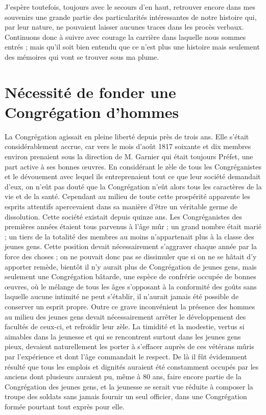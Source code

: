 J'espère toutefois, toujours avec le secours d'en haut, retrouver encore dans mes souvenirs une grande partie des particularités intéressantes de notre histoire qui, par leur nature, ne pouvaient laisser aucunes traces dans les procès verbaux. Continuons donc à suivre avec courage la carrière dans laquelle nous sommes entrés ; mais qu'il soit bien entendu que ce n'est plus une histoire mais seulement des mémoires qui vont se trouver sous ma plume.

\section*{Nécessité de fonder une Congrégation d'hommes}
La Congrégation agissait en pleine liberté depuis près de trois ans. Elle s'était considérablement accrue, car vers le mois d'août 1817 soixante et dix membres environ prenaient sous la direction de M. Garnier qui était toujours Préfet, une part active à ses bonnes œuvres. En considérant le zèle de tous les Congréganistes et le dévouement avec lequel ils entreprenaient tout ce que leur société demandait d'eux, on n'eût pas douté que la Congrégation n'eût alors tous les caractères de la vie et de la santé. Cependant au milieu de toute cette prospérité apparente les esprits attentifs apercevaient dans sa manière d'être un véritable germe de dissolution. Cette société existait depuis quinze ans. Les Congréganistes des premières années étaient tous parvenus à l'âge mûr ; un grand nombre était marié ; un tiers de la totalité des membres au moins n'appartenait plus à la classe des jeunes gens. Cette position devait nécessairement s'aggraver chaque année par la force des choses ; on ne pouvait donc pas se dissimuler que si on ne se hâtait d'y apporter remède, bientôt il n'y aurait plus de Congrégation de jeunes gens, mais seulement une
Congrégation bâtarde, une espèce de confrérie occupée de bonnes œuvres, où le mélange de tous les âges s'opposant à la conformité des goûts sans laquelle aucune intimité ne peut s'établir, il n'aurait jamais été possible de conserver un esprit propre. Outre ce grave inconvénient la présence des hommes au milieu des jeunes gens devait nécessairement arrêter le développement des facultés de ceux-ci, et refroidir leur zèle. La timidité et la modestie, vertus si aimables dans la jeunesse et qui se rencontrent surtout dans les jeunes gens pieux, devaient naturellement les porter à s'effacer auprès de ces vétérans mûris par l'expérience et dont l'âge commandait le respect. De là il fût évidemment résulté que tous les emplois et dignités auraient été constamment occupés par les anciens dont plusieurs auraient pu, même à 80 ans, faire encore partie de la Congrégation des jeunes gens, et la jeunesse se serait vue réduite à composer la troupe des soldats sans jamais fournir un seul officier, dans une Congrégation formée pourtant tout exprès pour elle.

